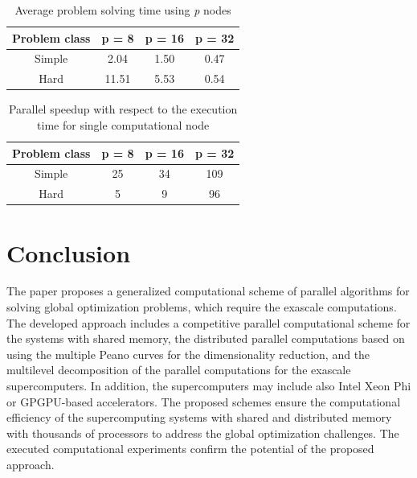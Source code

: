 \documentclass[
11pt,%
tightenlines,%
twoside,%
onecolumn,%
nofloats,%
nobibnotes,%
nofootinbib,%
superscriptaddress,%
noshowpacs,%
centertags]%
{revtex4}
\begin{document}
\begin{table}
	\caption{Average problem solving time using \textit{p} nodes}
	\label{tab:tab1}
	\center
	\begin{tabular}{|c|c|c|c|}
	\hline 
		Problem class & \parbox[c]{1.6cm}{ \centering p = 8 } & 
		\parbox[c]{1.6cm}{ \centering p = 16 } &
		\parbox[c]{1.6cm}{ \centering p = 32 } \\
	\hline 
		Simple &  2.04 & 1.50 & 0.47 \\
	\hline 
		Hard   & 11.51 & 5.53 & 0.54 \\
	\hline 
	\end{tabular}
\end{table}

\begin{table}
	\caption{Parallel speedup with respect to the execution time for single computational node}
	\label{tab:tab1}
	\center
	\begin{tabular}{|c|c|c|c|}
	\hline 
		Problem class & \parbox[c]{1.6cm}{ \centering p = 8 } & 
		\parbox[c]{1.6cm}{ \centering p = 16 } &
		\parbox[c]{1.6cm}{ \centering p = 32 } \\
	\hline 
		Simple & 25 & 34 & 109 \\
	\hline 
		Hard   & 5  & 9  & 96  \\
	\hline 
	\end{tabular}
\end{table}


\section{Conclusion}

The paper proposes a generalized computational scheme of parallel algorithms for solving global optimization problems, which require the exascale computations. The developed approach includes a competitive parallel computational scheme for the systems with shared memory, the distributed parallel computations based on using the multiple Peano curves for the dimensionality reduction, and the multilevel decomposition of the parallel computations for the exascale supercomputers. In addition, the supercomputers may include also Intel Xeon Phi or GPGPU-based accelerators. The proposed schemes ensure the computational efficiency of the supercomputing systems with shared and distributed memory with thousands of processors to address the global optimization challenges. The executed computational experiments confirm the potential of the proposed approach.
\end{document}
